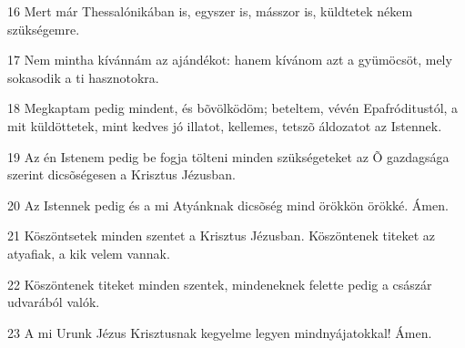\par 16 Mert már Thessalónikában is, egyszer is, másszor is, küldtetek nékem szükségemre.
\par 17 Nem mintha kívánnám az ajándékot: hanem kívánom azt a gyümöcsöt, mely sokasodik a ti hasznotokra.
\par 18 Megkaptam pedig mindent, és bõvölködöm; beteltem, vévén Epafróditustól, a mit küldöttetek, mint kedves jó illatot, kellemes, tetszõ áldozatot az Istennek.
\par 19 Az én Istenem pedig be fogja tölteni minden szükségeteket az Õ gazdagsága szerint dicsõségesen a Krisztus Jézusban.
\par 20 Az Istennek pedig és a mi Atyánknak dicsõség mind örökkön örökké. Ámen.
\par 21 Köszöntsetek minden szentet a Krisztus Jézusban. Köszöntenek titeket az atyafiak, a kik velem vannak.
\par 22 Köszöntenek titeket minden szentek, mindeneknek felette pedig a császár udvarából valók.
\par 23 A mi Urunk Jézus Krisztusnak kegyelme legyen mindnyájatokkal! Ámen.


